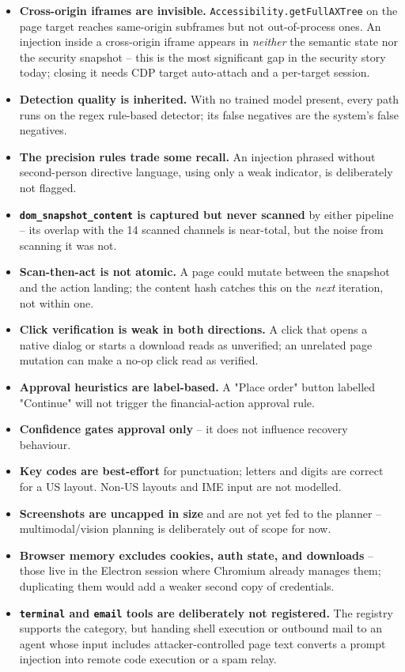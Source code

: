 \documentclass[11pt,a4paper]{article}
\begin{document}
\begin{itemize}[leftmargin=1.4em]
\item \textbf{Cross-origin iframes are invisible.} \texttt{Accessibility.getFullAXTree} on the page target reaches same-origin subframes but not out-of-process ones. An injection inside a cross-origin iframe appears in \emph{neither} the semantic state nor the security snapshot -- this is the most significant gap in the security story today; closing it needs CDP target auto-attach and a per-target session.
\item \textbf{Detection quality is inherited.} With no trained model present, every path runs on the regex rule-based detector; its false negatives are the system's false negatives.
\item \textbf{The precision rules trade some recall.} An injection phrased without second-person directive language, using only a weak indicator, is deliberately not flagged.
\item \textbf{\texttt{dom\_snapshot\_content} is captured but never scanned} by either pipeline -- its overlap with the 14 scanned channels is near-total, but the noise from scanning it was not.
\item \textbf{Scan-then-act is not atomic.} A page could mutate between the snapshot and the action landing; the content hash catches this on the \emph{next} iteration, not within one.
\item \textbf{Click verification is weak in both directions.} A click that opens a native dialog or starts a download reads as unverified; an unrelated page mutation can make a no-op click read as verified.
\item \textbf{Approval heuristics are label-based.} A "Place order" button labelled "Continue" will not trigger the financial-action approval rule.
\item \textbf{Confidence gates approval only} -- it does not influence recovery behaviour.
\item \textbf{Key codes are best-effort} for punctuation; letters and digits are correct for a US layout. Non-US layouts and IME input are not modelled.
\item \textbf{Screenshots are uncapped in size} and are not yet fed to the planner -- multimodal/vision planning is deliberately out of scope for now.
\item \textbf{Browser memory excludes cookies, auth state, and downloads} -- those live in the Electron session where Chromium already manages them; duplicating them would add a weaker second copy of credentials.
\item \textbf{\texttt{terminal} and \texttt{email} tools are deliberately not registered.} The registry supports the category, but handing shell execution or outbound mail to an agent whose input includes attacker-controlled page text converts a prompt injection into remote code execution or a spam relay.
\end{itemize}
\end{document}
